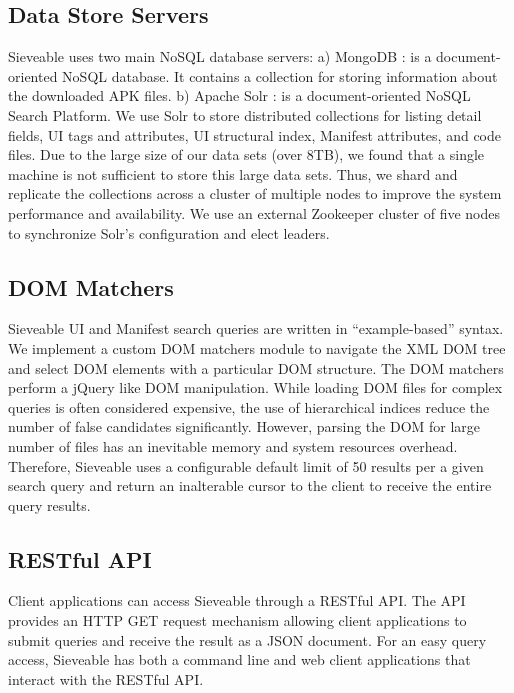 \subsection{Data Store Servers}
Sieveable uses two main NoSQL database servers:
a) MongoDB \cite{mongodb}: is a document-oriented NoSQL database. It contains a collection for storing information about the downloaded APK files.
b) Apache Solr \cite{solr}: is a document-oriented NoSQL Search Platform.
We use Solr to store distributed collections for listing detail fields, UI tags and attributes, UI structural index, Manifest attributes, and code files.
Due to the large size of our data sets (over 8TB), we found that a single machine is not sufficient to store this large data sets.
Thus, we shard and replicate the collections across a cluster of multiple nodes to improve the system performance and availability.
We use an external Zookeeper \cite{zookeeper} cluster of five nodes to synchronize Solr's configuration and elect leaders.
\subsection{DOM Matchers}

Sieveable UI and Manifest search queries are written in  ``example-based'' syntax.
We implement a custom DOM matchers module to navigate the XML DOM tree and select DOM elements with a particular DOM structure.
The DOM matchers perform a jQuery like DOM manipulation.
While loading DOM files for complex queries is often considered expensive, the use of hierarchical indices reduce the number of false candidates significantly.
However, parsing the DOM for large number of files has an inevitable memory and system resources overhead.
Therefore, Sieveable uses a configurable default limit of 50 results per a given search query and return an inalterable cursor to the client to receive the entire query results.

\subsection{RESTful API}
Client applications can access Sieveable through a RESTful API.
The API provides an HTTP GET request mechanism allowing client applications to submit queries and receive the result as a JSON document.
For an easy query access, Sieveable has both a command line and web client applications that interact with the RESTful API.


